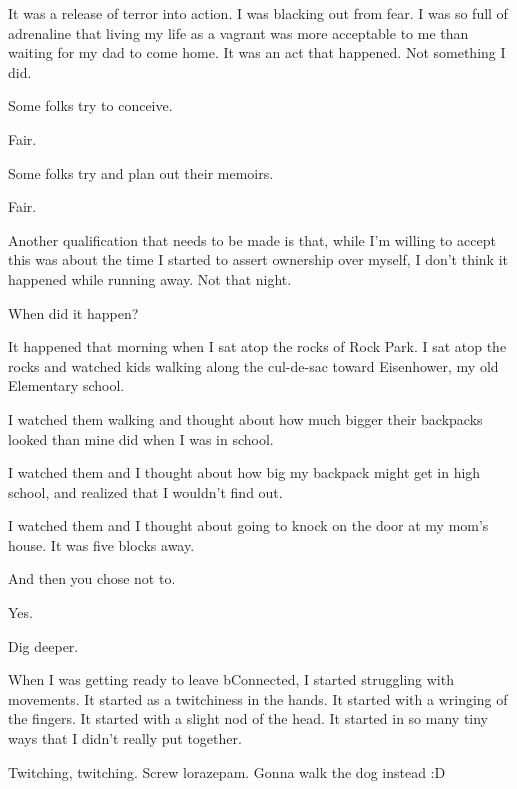 \begin{paracol}{2}
\begin{leftcolumn}
It was a release of terror into action. I was blacking out from fear. I was so full of adrenaline that living my life as a vagrant was more acceptable to me than waiting for my dad to come home. It was an act that happened. Not something I did.

\begin{ally}
Some folks try to conceive.
\end{ally}
Fair.

Some folks try and plan out their memoirs.

\begin{ally}
Fair.
\end{ally}
Another qualification that needs to be made is that, while I'm willing to accept this was about the time I started to assert ownership over myself, I don't think it happened while running away. Not that night.

\begin{ally}
When did it happen?
\end{ally}
It happened that morning when I sat atop the rocks of Rock Park. I sat atop the rocks and watched kids walking along the cul-de-sac toward Eisenhower, my old Elementary school.

I watched them walking and thought about how much bigger their backpacks looked than mine did when I was in school.

I watched them and I thought about how big my backpack might get in high school, and realized that I wouldn't find out.

I watched them and I thought about going to knock on the door at my mom's house. It was five blocks away.

\begin{ally}
And then you chose not to.
\end{ally}
Yes.

\begin{ally}
Dig deeper.
\end{ally}
\newpage

When I was getting ready to leave bConnected, I started struggling with movements. It started as a twitchiness in the hands. It started with a wringing of the fingers. It started with a slight nod of the head. It started in so many tiny ways that I didn't really put together.

Twitching, twitching. Screw lorazepam. Gonna walk the dog instead :D


\end{leftcolumn}
\end{paracol}
